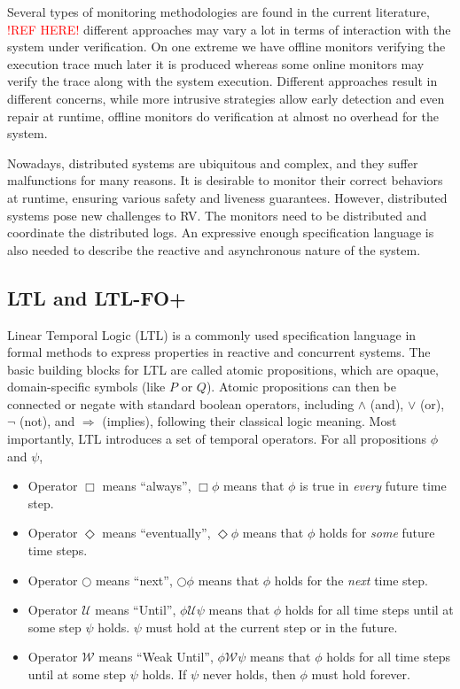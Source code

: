 \documentclass[format=acmsmall, nonacm=true, review=true, screen=true]{acmart}
\newcommand{\red}[1]{\textcolor{red}{#1}}
\begin{document}
Several types of monitoring methodologies are found in the current literature, \red{!REF HERE!} different approaches may vary a lot in terms of interaction with the system under verification. On one extreme we have offline monitors verifying the execution trace much later it is produced whereas some online monitors may verify the trace along with the system execution. Different approaches result in different concerns, while more intrusive strategies allow early detection and even repair at runtime, offline monitors do verification at almost no overhead for the system.

Nowadays, distributed systems are ubiquitous and complex, and they suffer malfunctions for many reasons. It is desirable to monitor their correct behaviors at runtime, ensuring various safety and liveness guarantees. However, distributed systems pose new challenges to RV. The monitors need to be distributed and coordinate the distributed logs. An expressive enough specification language is also needed to describe the reactive and asynchronous nature of the system.

\subsection{LTL and LTL-FO+}
Linear Temporal Logic (LTL) is a commonly used specification language in formal methods to express properties in reactive and concurrent systems. The basic building blocks for LTL are called atomic propositions, which are opaque, domain-specific symbols (like $P$ or $Q$). Atomic propositions can then be connected or negate with standard boolean operators, including $\land$ (and), $\lor$ (or), $\lnot$ (not), and $\Rightarrow$ (implies), following their classical logic meaning. Most importantly, LTL introduces a set of temporal operators. For all propositions $\phi$ and $\psi$,
\begin{itemize}
  \item Operator $\Box$ means ``always'', $\Box \phi$ means that $\phi$ is true in \textit{every} future time step.
  \item Operator $\Diamond$ means ``eventually'', $\Diamond \phi$ means that $\phi$ holds for \textit{some} future time steps.
  \item Operator $\bigcirc$ means ``next'', $\bigcirc \phi$ means that $\phi$ holds for the \textit{next} time step.
  \item Operator $\mathcal{U}$ means ``Until'', $\phi \mathcal{U}\psi$ means that $\phi$ holds for all time steps until at some step $\psi$ holds. $\psi$ must hold at the current step or in the future.
  \item Operator $\mathcal{W}$ means ``Weak Until'', $\phi \mathcal{W}\psi$ means that $\phi$ holds for all time steps until at some step $\psi$ holds. If $\psi$ never holds, then $\phi$ must hold forever.
\end{itemize}
\end{document}
